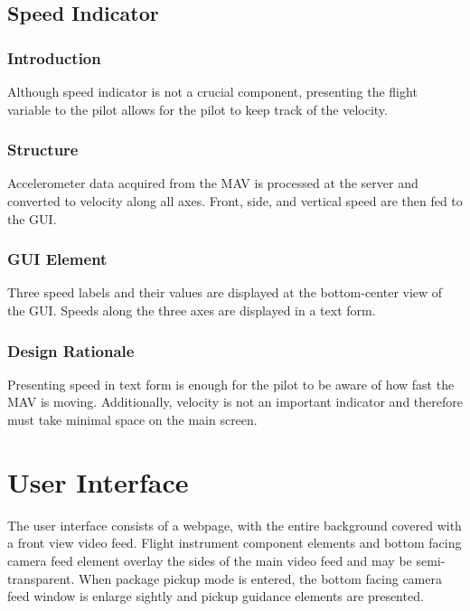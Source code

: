 \documentclass[onecolumn, draftclsnofoot, 10pt, compsoc]{IEEEtran}
\begin{document}
\subsection{Speed Indicator}
\subsubsection{Introduction}
Although speed indicator is not a crucial component, presenting the flight variable to the pilot allows for the pilot to keep track of the velocity.

\subsubsection{Structure}
Accelerometer data acquired from the MAV is processed at the server and converted to velocity along all axes. Front, side, and vertical speed are then fed to the GUI.

\subsubsection{GUI Element}
Three speed labels and their values are displayed at the bottom-center view of the GUI. Speeds along the three axes are displayed in a text form.

\subsubsection{Design Rationale}
Presenting speed in text form is enough for the pilot to be aware of how fast the MAV is moving. Additionally, velocity is not an important indicator and therefore must take minimal space on the main screen.

\section{User Interface}
The user interface consists of a webpage, with the entire background covered with a front view video feed. Flight instrument component elements and bottom facing camera feed element overlay the sides of the main video feed and may be semi-transparent. When package pickup mode is entered, the bottom facing camera feed window is enlarge sightly and pickup guidance elements are presented.

\clearpage
\medskip


\end{document}

